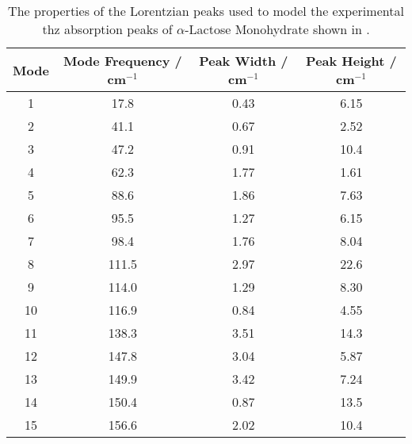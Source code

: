 \begin{table}
\centering
\begin{tabular}{@{}cccc@{}}
\toprule
Mode & Mode Frequency / cm\({^{-1}}\) & Peak Width / cm\({^{-1}}\) & Peak Height / cm\({^{-1}}\) \\ \midrule
1 &
17.8 &
0.43 &
6.15 \\

2 &
41.1 &
0.67 &
2.52 \\

3 &
47.2 & 
0.91 &
10.4 \\

4 &
62.3 &
1.77 &
1.61 \\

5 &
88.6 &
1.86 &
7.63 \\

6 &
95.5 &
1.27 &
6.15 \\

7 &
98.4 &
1.76 &
8.04 \\

8 &
111.5 &
2.97 &
22.6 \\

9 &
114.0 &
1.29 &
8.30 \\

10 &
116.9 &
0.84 &
4.55 \\

11 &
138.3 &
3.51 &
14.3 \\

12 &
147.8 &
3.04 &
5.87\\

13 &
149.9 &
3.42 &
7.24 \\

14 &
150.4 &
0.87 &
13.5 \\

15 &
156.6 &
2.02 &
10.4 \\ \bottomrule
\end{tabular}
\captionsetup{font = footnotesize, justification = centering}
\caption[The Properties of the Lorentzian Peaks used to Model the Experimental Terahertz Absorption Peaks of \(\alpha\)-Lactose Monohydrate]{The properties of the Lorentzian peaks used to model the experimental \acrshort{thz} absorption peaks of \(\alpha\)-Lactose Monohydrate shown in .}
\label{tab:exp_peak_widths}
\end{table}

